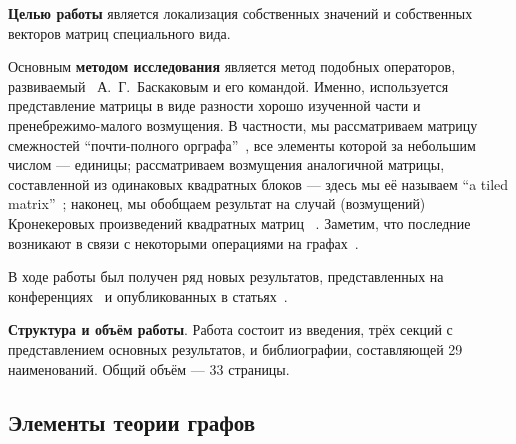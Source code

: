 \documentclass[14pt,a4paper]{extarticle}
\numberwithin{equation}{section}
\theoremstyle{definition}
\begin{document}
\textbf{Целью работы}
является локализация собственных значений и собственных векторов
матриц специального вида.

Основным \textbf{методом исследования} является ме\-тод подобных опер\-атор\-ов,
развиваемый~\cite{baskakov1986theorem,baskakov1987theorem,baskakov1994spectral,baskakov2002splitting}
А.~Г.~Баскаковым и его командой. Именно, используется представление матрицы
в виде разности хорошо изученной части и пренебрежимо-малого возмущения.
В частности, мы рас\-сматр\-иваем матрицу смежностей
``почти-полного орграфа''~\cite{Koz17,sergekozlukov@vspu},
все элементы которой за небольшим числом --- единицы;
рассматриваем возмущения аналогичной матрицы, составленной из одинаковых
квадрат\-ных блоков --- здесь мы её называем ``a tiled
matrix''~\cite{Koz18,sergekozlukov@currentproblems};
наконец, мы обобщ\-аем результат на случай (возмущений) Кронекер\-овых
произведений квадратных матриц
~\cite{Koz18,sergekozlukov@currentproblems,bellman-matrices-kron,XIANG2005210}.
Заметим, что последние возникают в связи с некоторыми операциями на графах~\cite{cvetkovic1997eigenspaces}.

В ходе работы был получен ряд новых результатов, представленных на
конференциях~\cite{sergekozlukov@vspu,sergekozlukov@currentproblems} и
опубликованных в статьях~\cite{Koz17,Koz18}.

\textbf{Структура и объём работы}. Работа состоит из введения, трёх секций с
представлением основных результатов, и би\-блио\-графии, со\-став\-ляющей 29
на\-имено\-ва\-ний. Общий объём --- 33 страницы.


\subsection{Элементы теории графов}
\end{document}
